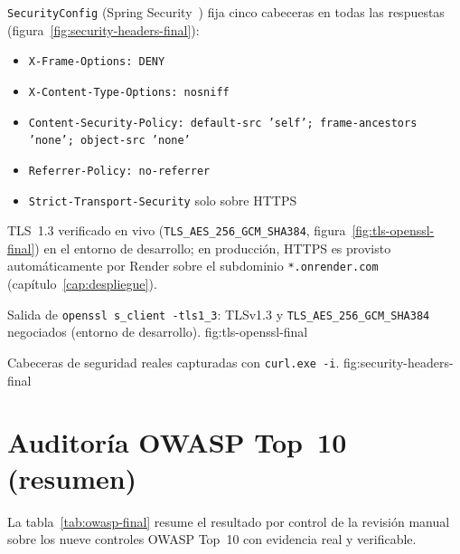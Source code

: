 \texttt{SecurityConfig} (Spring Security~\cite{spring-security-docs}) fija
cinco cabeceras en todas las respuestas (figura~\ref{fig:security-headers-final}):

\begin{itemize}[nosep]
  \item \texttt{X-Frame-Options: DENY}
  \item \texttt{X-Content-Type-Options: nosniff}
  \item \texttt{Content-Security-Policy: default-src 'self';
    frame-ancestors 'none'; object-src 'none'}
  \item \texttt{Referrer-Policy: no-referrer}
  \item \texttt{Strict-Transport-Security} solo sobre HTTPS
\end{itemize}

TLS~1.3 verificado en vivo
(\texttt{TLS\_AES\_256\_GCM\_SHA384}, figura~\ref{fig:tls-openssl-final})
en el entorno de desarrollo; en
producci\'on, HTTPS es provisto autom\'aticamente por Render sobre el
subdominio \texttt{*.onrender.com} (cap\'itulo~\ref{cap:despliegue}).

%
{Salida de \texttt{openssl s\_client -tls1\_3}: TLSv1.3 y \texttt{TLS\_AES\_256\_GCM\_SHA384} negociados (entorno de desarrollo).}%
{fig:tls-openssl-final}

%
{Cabeceras de seguridad reales capturadas con \texttt{curl.exe -i}.}%
{fig:security-headers-final}

\section{Auditor\'ia OWASP Top~10 (resumen)}

La tabla~\ref{tab:owasp-final} resume el resultado por control de la
revisi\'on manual sobre los nueve controles OWASP Top~10 con evidencia
real y verificable.


